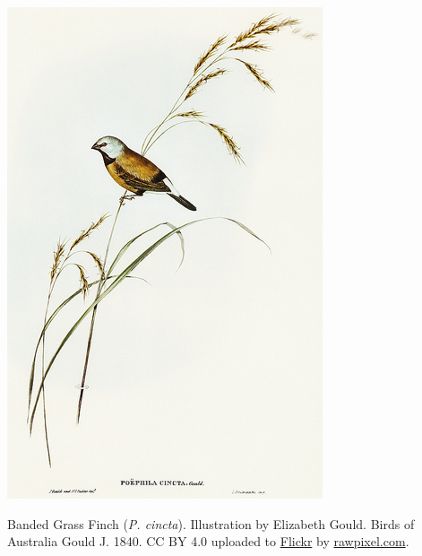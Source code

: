 \begin{marginfigure}
\begin{center}
\includegraphics[width=\textwidth]{illustration_images/Genetic_drift/Poephila_cincta_finch/Poephila_cincta_finch.png}
\end{center}
\caption{Banded Grass Finch ({\it P. cincta}). Illustration by
  Elizabeth Gould.
  \newline \noindent \tiny{Birds of Australia Gould J. 1840. CC BY 4.0 uploaded to \href{https://www.flickr.com/photos/vintage_illustration/41073432105/in/photolist-WpHYmR-WBF2Uc-Uoq2kW-QAW9bN-UL33uh-RmyMxt-PKmBjN-8xpKmQ-8xmHg2-H6mfAS-dVREvC-7Qepuh-222xkPQ-7QepzS-25zw6ak-W28Nyk-Qa6d32-ijh2uH-6V8Srd-25zw5ov-8xpKB7-nUQ33T-6V8TLy-nV88oH-25RuYmq-21TcFz1-R2Gdy4-GdWRgi-GdMmry-GdWAwD-9mjwfA-25oHWeJ-HMbQre-6CQWTH-7TjKu-e6SYV-25RuXU3-pdKtxc-9hYCzE-voj7Sj-zqSdQb-6SNmDE-a1datx-a1dasZ-PFfPXY-rR7QYw-GJ7rey-6SJmuB-7TjFh}{Flickr} by \url{rawpixel.com}.}} \label{fig:Poephila_cincta} 
\end{marginfigure}


